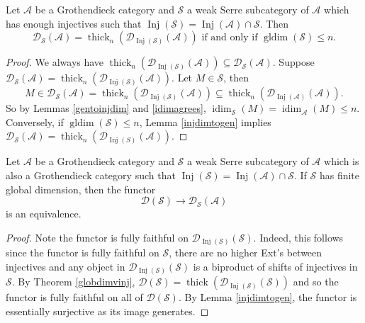 \documentclass[12pt,oneside]{amsart}
\DeclareMathOperator*{\Inj}{Inj}
\DeclareMathOperator{\thick}{thick}
\DeclareMathOperator{\idim}{idim}
\DeclareMathOperator{\gldim}{gldim}
\begin{document}
\begin{theorem} \label{globdimvinj}
Let $\mathcal{A}$ be a Grothendieck category and $\mathcal{S}$ a weak Serre subcategory of $\mathcal{A}$ which has enough injectives such that $\Inj(\mathcal{S}) = \Inj(\mathcal{A}) \cap \mathcal{S}$. Then
\[
\mathcal{D}_{\mathcal{S}}(\mathcal{A}) = \thick_n(\mathcal{D}_{\Inj(\mathcal{S})}(\mathcal{A})) \text{ if and only if }\gldim(\mathcal{S}) \leq n.
\]
\end{theorem}


\begin{proof}
We always have $\thick_n(\mathcal{D}_{\Inj(\mathcal{S})}(\mathcal{A})) \subseteq \mathcal{D}_{\mathcal{S}}(\mathcal{A})$. Suppose $\mathcal{D}_{\mathcal{S}}(\mathcal{A}) = \thick_n(\mathcal{D}_{\Inj(\mathcal{S})}(\mathcal{A}))$. Let $M \in \mathcal{S}$, then 
\[
M \in \mathcal{D}_{\mathcal{S}}(\mathcal{A}) = \thick_n(\mathcal{D}_{\Inj(\mathcal{S})}(\mathcal{A})) \subseteq \thick_n(\mathcal{D}_{\Inj(\mathcal{A})}(\mathcal{A})).  
\]
So by Lemmas \ref{gentoinjdim} and \ref{idimagrees}, $\idim_{\mathcal{S}}(M) = \idim_{\mathcal{A}}(M) \leq n$. Conversely, if $\gldim(\mathcal{S}) \leq n$, Lemma \ref{injdimtogen} implies $\mathcal{D}_{\mathcal{S}}(\mathcal{A}) = \thick_n(\mathcal{D}_{\Inj(S)}(\mathcal{A}))$.
\end{proof}



\begin{cor} \label{stupidthing}
Let $\mathcal{A}$ be a Grothendieck category and $\mathcal{S}$ a weak Serre subcategory of $\mathcal{A}$ which is also a Grothendieck category such that $\Inj(\mathcal{S}) = \Inj(\mathcal{A}) \cap \mathcal{S}$. If $\mathcal{S}$ has finite global dimension, then the functor
\[
\mathcal{D}(\mathcal{S}) \to \mathcal{D}_{\mathcal{S}}(\mathcal{A})
\]
is an equivalence.
\end{cor}

\begin{proof}
Note the functor is fully faithful on $\mathcal{D}_{\Inj(\mathcal{S})}(\mathcal{S})$. Indeed, this follows since the functor is fully faithful on $\mathcal{S}$, there are no higher Ext's between injectives and any object in $\mathcal{D}_{\Inj(\mathcal{S})}(\mathcal{S})$ is a biproduct of shifts of injectives in $\mathcal{S}$. By Theorem \ref{globdimvinj}, $\mathcal{D}(\mathcal{S}) = \thick(\mathcal{D}_{\Inj(\mathcal{S})}(\mathcal{S}))$ and so the functor is fully faithful on all of $\mathcal{D}(\mathcal{S})$. By Lemma \ref{injdimtogen}, the functor is essentially surjective as its image generates. 
\end{proof}
\end{document}
